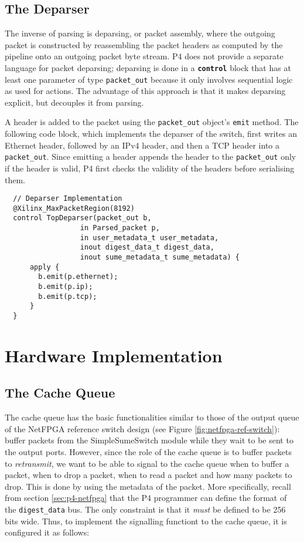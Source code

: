 	\subsection{The Deparser}
The inverse of parsing is deparsing, or packet assembly, where the outgoing packet is constructed by reassembling the packet headers as computed by the pipeline onto an outgoing packet byte stream. P4 does not provide a separate language for packet deparsing; deparsing is done in a \textbf{\texttt{control}} block that has at least one parameter of type \verb|packet_out| because it only involves sequential logic as used for actions. The advantage of this approach is that it makes deparsing explicit, but decouples it from parsing. 

A header is added to the packet using the \verb|packet_out| object's \texttt{emit} method. The following code block, which implements the deparser of the switch, first writes an Ethernet header, followed by an IPv4 header, and then a TCP header into a \verb|packet_out|. Since emitting a header appends the header to the \verb|packet_out| only if the header is valid, P4 first checks the validity of the headers before serialising them.

{\renewcommand{\baselinestretch}{0.8}\small
\begin{verbatim}
  // Deparser Implementation
  @Xilinx_MaxPacketRegion(8192)
  control TopDeparser(packet_out b,
                  in Parsed_packet p,
                  in user_metadata_t user_metadata,
                  inout digest_data_t digest_data, 
                  inout sume_metadata_t sume_metadata) { 
      apply {
        b.emit(p.ethernet); 
        b.emit(p.ip);
        b.emit(p.tcp);
      }
  }
\end{verbatim}
}

\section{Hardware Implementation}
	\label{sec:hardware}
	\subsection{The Cache Queue}
The cache queue has the basic functionalities similar to those of the output queue of the NetFPGA reference switch design (see Figure \ref{fig:netfpga-ref-switch}): buffer packets from the SimpleSumeSwitch module while they wait to be sent to the output ports. However, since the role of the cache queue is to buffer packets to \textit{retransmit}, we want to be able to signal to the cache queue when to buffer a packet, when to drop a packet, when to read a packet and how many packets to drop. This is done by using the metadata of the packet. More specifically, recall from section \ref{sec:p4-netfpga} that the P4 programmer can define the format of the \verb|digest_data| bus. The only constraint is that it \textit{must} be defined to be 256 bits wide. Thus, to implement the signalling functiont to the cache queue, it is configured it as follows:


